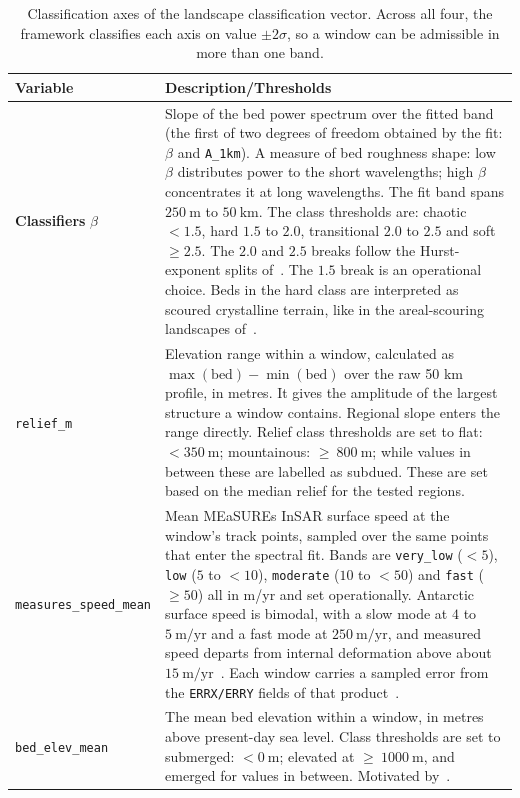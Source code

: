 \begin{table}[H]
\centering
\caption{Classification axes of the landscape classification vector. Across all four, the framework classifies each axis on value $\pm2\sigma$, so a window can be admissible in more than one band.}
\label{tab:axes}
\begin{tabularx}{\textwidth}{p{4.0cm} X}
\toprule
\textbf{Variable} & \textbf{Description/Thresholds} \\
\midrule
\textbf{Classifiers} 
  $\beta$ & Slope of the bed power spectrum over the fitted band (the first of two degrees of freedom obtained by the fit: $\beta$ and \texttt{A\_1km}). A measure of bed roughness shape: low $\beta$ distributes power to the short wavelengths; high $\beta$ concentrates it at long wavelengths. The fit band spans $250~\mathrm{m}$ to $50~\mathrm{km}$. The class thresholds are: chaotic $< 1.5$, hard $1.5$ to $2.0$, transitional $2.0$ to $2.5$ and soft $\geq2.5$. The $2.0$ and $2.5$ breaks follow the Hurst-exponent splits of~\cite{Jordan_2017}. The $1.5$ break is an operational choice. Beds in the hard class are interpreted as scoured crystalline terrain, like in the areal-scouring landscapes of~\cite{Sugden_1978}. \\
  \addlinespace[0.5em]
  \texttt{relief\_m} & Elevation range within a window, calculated as $\max\mathrm{(bed)} - \min\mathrm{(bed)}$ over the raw 50 km profile, in metres. It gives the amplitude of the largest structure a window contains. Regional slope enters the range directly. Relief class thresholds are set to flat: $<350~\mathrm{m}$; mountainous: $\geq~800~\mathrm{m}$; while values in between these are labelled as subdued. These are set based on the median relief for the tested regions.\\
  \addlinespace[0.5em]
  \texttt{measures\_speed\_mean} & Mean MEaSUREs InSAR surface speed at the window's track points, sampled over the same points that enter the spectral fit. Bands are \texttt{very\_low} ($<5$), \texttt{low} ($5$ to $<10$), \texttt{moderate} ($10$ to $<50$) and \texttt{fast} ($\geq50$) all in m/yr and set operationally. Antarctic surface speed is bimodal, with a slow
  mode at $4$ to $5~\mathrm{m/yr}$ and a fast mode at $250~\mathrm{m/yr}$, and measured speed departs from internal deformation above about $15~\mathrm{m/yr}$~\cite{Rignot_2011}. Each window carries a sampled error from the \texttt{ERRX/ERRY} fields of that product~\cite{Rignot_2017}.\\
  \addlinespace[0.5em]
  \texttt{bed\_elev\_mean} & The mean bed elevation within a window, in metres above present-day sea level. Class thresholds are set to submerged: $<0~\mathrm{m}$; elevated at $\geq~1000~\mathrm{m}$, and emerged for values in between. Motivated by~\cite{Siegert_2004, Rippin_2014, Frederick_2016}. \\
\bottomrule
\end{tabularx}
\end{table}

